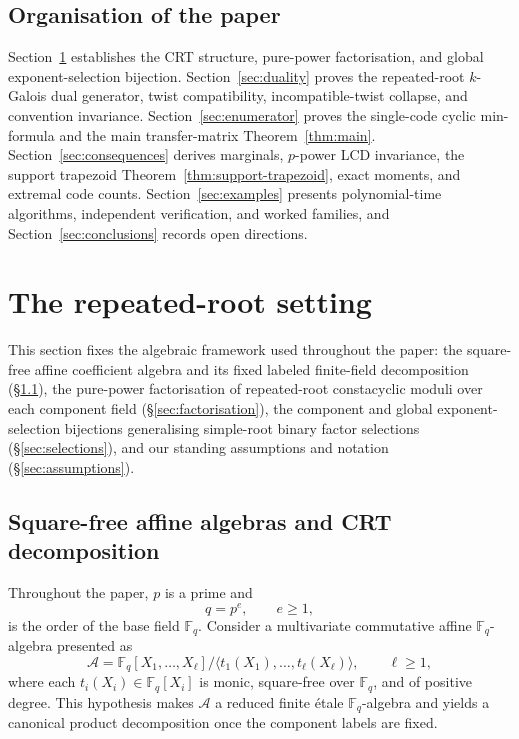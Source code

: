\documentclass[preprint,12pt]{elsarticle}
\newcommand{\F}{\mathbb F}
\newcommand{\A}{\mathcal A}
\numberwithin{equation}{section}
\theoremstyle{plain}
\theoremstyle{definition}
\theoremstyle{remark}
\begin{document}
\subsection*{Organisation of the paper}
Section~\ref{sec:setting} establishes the CRT structure, pure-power factorisation,
and global exponent-selection bijection. Section~\ref{sec:duality} proves the
repeated-root $k$-Galois dual generator, twist compatibility, incompatible-twist
collapse, and convention invariance. Section~\ref{sec:enumerator} proves the
single-code cyclic min-formula and the main transfer-matrix Theorem~\ref{thm:main}.
Section~\ref{sec:consequences} derives marginals, $p$-power LCD invariance, the
support trapezoid Theorem~\ref{thm:support-trapezoid}, exact moments, and extremal
code counts. Section~\ref{sec:examples} presents polynomial-time algorithms,
independent verification, and worked families, and Section~\ref{sec:conclusions}
records open directions.

\section{The repeated-root setting}\label{sec:setting}

This section fixes the algebraic framework used throughout the paper: the
square-free affine coefficient algebra and its fixed labeled finite-field
decomposition (\S\ref{sec:setup}), the pure-power factorisation of
repeated-root constacyclic moduli over each component field
(\S\ref{sec:factorisation}), the component and global exponent-selection
bijections generalising simple-root binary factor selections
(\S\ref{sec:selections}), and our standing assumptions and notation
(\S\ref{sec:assumptions}).

\subsection{Square-free affine algebras and CRT decomposition}\label{sec:setup}

Throughout the paper, $p$ is a prime and
\[
q=p^e,\qquad e\ge 1,
\]
is the order of the base field $\F_q$. Consider a multivariate commutative
affine $\F_q$-algebra presented as
\begin{equation}\label{eq:algebra}
\A=\F_q[X_1,\dots,X_\ell]\big/\langle t_1(X_1),\dots,t_\ell(X_\ell)\rangle,
\qquad \ell\ge 1,
\end{equation}
where each $t_i(X_i)\in\F_q[X_i]$ is monic, square-free over $\F_q$, and of
positive degree. This hypothesis makes $\A$ a reduced finite \'etale
$\F_q$-algebra and yields a canonical product decomposition once the component
labels are fixed.
\end{document}

